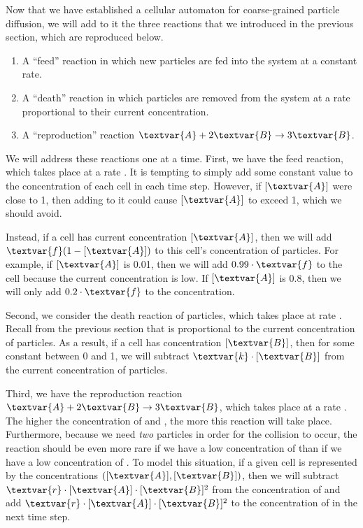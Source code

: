Now that we have established a cellular automaton for coarse-grained particle diffusion, we will add to it the three reactions that we introduced in the previous section, which are reproduced below.

\begin{enumerate}
\item A ``feed'' reaction in which new  particles are fed into the system at a constant rate.
\item A ``death'' reaction in which  particles are removed from the system at a rate proportional to their current concentration.
\item A ``reproduction'' reaction $\textvar{A} + 2\textvar{B} \rightarrow 3\textvar{B}$.
\end{enumerate}

\begin{qbox}\end{qbox}

We will address these reactions one at a time. First, we have the feed reaction, which takes place at a rate . It is tempting to simply add some constant value  to the concentration of each cell in each time step. However, if $[\textvar{A}]$ were close to 1, then adding  to it could cause $[\textvar{A}]$ to exceed 1, which we should avoid.

Instead, if a cell has current concentration $[\textvar{A}]$, then we will add $\textvar{f}(1-[\textvar{A}])$ to this cell's concentration of  particles. For example, if $[\textvar{A}]$ is 0.01, then we will add $0.99 \cdot \textvar{f}$ to the cell because the current concentration is low. If $[\textvar{A}]$ is 0.8, then we will only add $0.2 \cdot \textvar{f}$ to the concentration.

Second, we consider the death reaction of  particles, which takes place at rate . Recall from the previous section that  is proportional to the current concentration of  particles. As a result, if a cell has concentration $[\textvar{B}]$, then for some constant  between 0 and 1, we will subtract $\textvar{k} \cdot [\textvar{B}]$ from the current concentration of  particles.

Third, we have the reproduction reaction $\textvar{A} + 2\textvar{B} \rightarrow 3\textvar{B}$, which takes place at a rate . The higher the concentration of  and , the more this reaction will take place. Furthermore, because we need \textit{two}  particles in order for the collision to occur, the reaction should be even more rare if we have a low concentration of  than if we have a low concentration of . To model this situation, if a given cell is represented by the concentrations $([\textvar{A}], [\textvar{B}])$, then we will subtract $\textvar{r} \cdot [\textvar{A}] \cdot [\textvar{B}]^2$ from the concentration of  and add $\textvar{r} \cdot [\textvar{A}] \cdot [\textvar{B}]^2$ to the concentration of  in the next time step.

